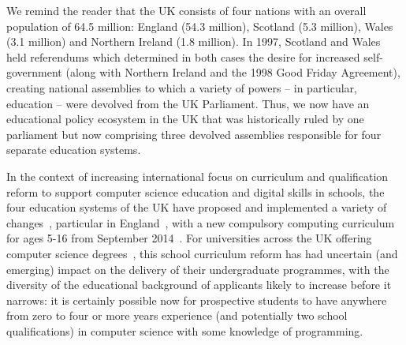 \documentclass[english]{programming}
\begin{document}
We remind the reader that the UK consists of four nations with an
overall population of 64.5 million: England (54.3 million), Scotland
(5.3 million), Wales (3.1 million) and Northern Ireland (1.8
million). In 1997, Scotland and Wales held referendums which
determined in both cases the desire for increased self-government
(along with Northern Ireland and the 1998 Good Friday Agreement),
creating national assemblies to which a variety of powers -- in
particular, education -- were devolved from the UK Parliament. Thus,
we now have an educational policy ecosystem in the UK that was
historically ruled by one parliament but now comprising three devolved
assemblies responsible for four separate education systems.

In the context of increasing international focus on curriculum and
qualification reform to support computer science education and digital
skills in schools, the four education systems of the UK have proposed
and implemented a variety of
changes~\cite{crick+sentance:2011,rs:2012,brown-et-al-sigcse2013,crick+moller-wipsce2015},
particular in England~\cite{brown-et-al-toce2014}, with a new
compulsory computing curriculum for ages 5-16 from September
2014~\cite{dfecomp:2013}. For universities across the UK offering
computer science degrees~\cite{qaacomp:2016}, this school curriculum
reform has had uncertain (and emerging) impact on the delivery of
their undergraduate programmes, with the diversity of the educational
background of applicants likely to increase before it narrows: it is
certainly possible now for prospective students to have anywhere from
zero to four or more years experience (and potentially two school
qualifications) in computer science with some knowledge of
programming.
\end{document}
